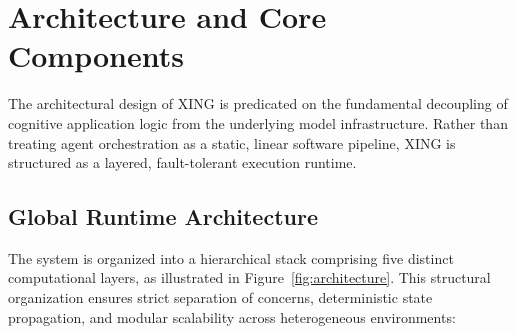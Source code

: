 \documentclass[conference]{IEEEtran}
\begin{document}
\begin{table}[t]
\caption{Structural Comparison of AI Orchestration Paradigms}
\label{tab:comparison}
\centering
{}
\end{table}

\section{Architecture and Core Components}

The architectural design of XING is predicated on the fundamental decoupling of cognitive application logic from the underlying model infrastructure. Rather than treating agent orchestration as a static, linear software pipeline, XING is structured as a layered, fault-tolerant execution runtime.

\subsection{Global Runtime Architecture}

The system is organized into a hierarchical stack comprising five distinct computational layers, as illustrated in Figure~\ref{fig:architecture}. This structural organization ensures strict separation of concerns, deterministic state propagation, and modular scalability across heterogeneous environments:
\end{document}

